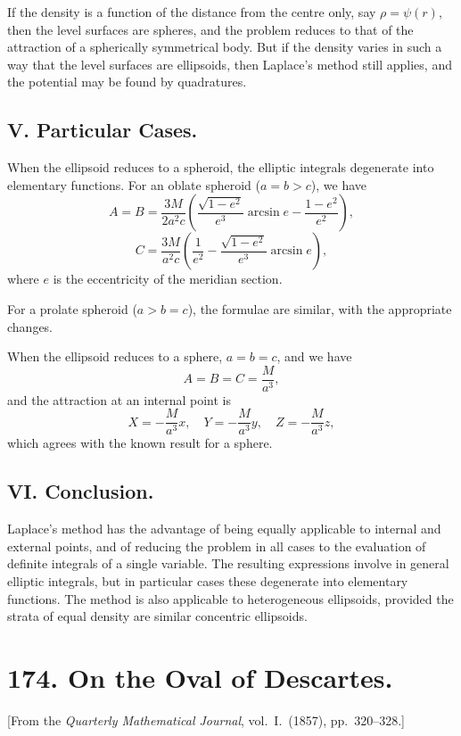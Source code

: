 \documentclass[11pt,a4paper]{article}
\theoremstyle{plain}
\begin{document}
If the density is a function of the distance from the centre only, say $\rho=\psi(r)$, then the level surfaces are spheres, and the problem reduces to that of the attraction of a spherically symmetrical body. But if the density varies in such a way that the level surfaces are ellipsoids, then Laplace's method still applies, and the potential may be found by quadratures.

\subsection*{V. Particular Cases.}

When the ellipsoid reduces to a spheroid, the elliptic integrals degenerate into elementary functions. For an oblate spheroid ($a=b>c$), we have
\[
A = B = \frac{3M}{2a^2c}\left(\frac{\sqrt{1-e^2}}{e^3}\arcsin e - \frac{1-e^2}{e^2}\right),
\]
\[
C = \frac{3M}{a^2c}\left(\frac{1}{e^2} - \frac{\sqrt{1-e^2}}{e^3}\arcsin e\right),
\]
where $e$ is the eccentricity of the meridian section.

For a prolate spheroid ($a>b=c$), the formulae are similar, with the appropriate changes.

When the ellipsoid reduces to a sphere, $a=b=c$, and we have
\[
A = B = C = \frac{M}{a^3},
\]
and the attraction at an internal point is
\[
X = -\frac{M}{a^3}x,\quad Y = -\frac{M}{a^3}y,\quad Z = -\frac{M}{a^3}z,
\]
which agrees with the known result for a sphere.

\subsection*{VI. Conclusion.}

Laplace's method has the advantage of being equally applicable to internal and external points, and of reducing the problem in all cases to the evaluation of definite integrals of a single variable. The resulting expressions involve in general elliptic integrals, but in particular cases these degenerate into elementary functions. The method is also applicable to heterogeneous ellipsoids, provided the strata of equal density are similar concentric ellipsoids.


\newpage
\section*{174. On the Oval of Descartes.}

[From the \textit{Quarterly Mathematical Journal}, vol.~I.~(1857), pp.~320--328.]
\end{document}
